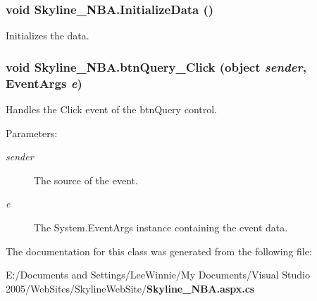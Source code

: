 \subsubsection{\setlength{\rightskip}{0pt plus 5cm}void Skyline\_\-NBA.Initialize\-Data ()\hspace{0.3cm}{\tt  [private]}}\label{class_skyline___n_b_a_be6c98348f8a28bcdec8a34008eea9a9}


Initializes the data. 

\subsubsection{\setlength{\rightskip}{0pt plus 5cm}void Skyline\_\-NBA.btn\-Query\_\-Click (object {\em sender}, Event\-Args {\em e})\hspace{0.3cm}{\tt  [protected]}}\label{class_skyline___n_b_a_3fbfaad6e0029b03edeac4804746d476}


Handles the Click event of the btn\-Query control. 

\begin{Desc}
\item[Parameters:]
\begin{description}
\item[{\em sender}]The source of the event.\item[{\em e}]The System.Event\-Args instance containing the event data.\end{description}
\end{Desc}


The documentation for this class was generated from the following file:\begin{CompactItemize}
\item 
E:/Documents and Settings/Lee\-Winnie/My Documents/Visual Studio 2005/Web\-Sites/Skyline\-Web\-Site/{\bf Skyline\_\-NBA.aspx.cs}\end{CompactItemize}
